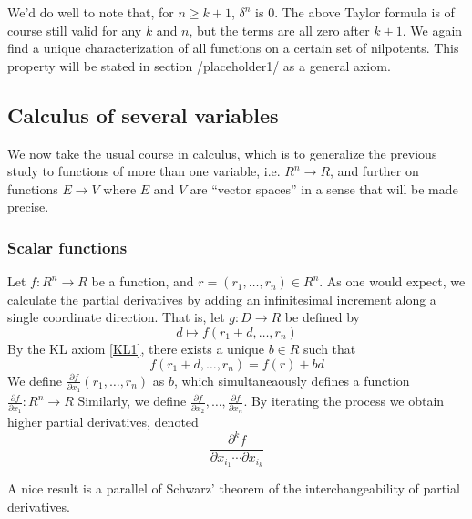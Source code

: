 \documentclass[11pt]{article}
\theoremstyle{definition}
\newcommand{\ddx}[2]{\frac{\partial #1}{\partial #2}} %
\newcommand{\ddxk}[4]{\frac{\partial^{#1} #2}{\partial #3 \cdots \partial #4}} %
\numberwithin{equation}{section}
\begin{document}
We'd do well to note that, for \( n\geq k+1 \), \( \delta^n \) is 0. The above Taylor formula is of course still valid for any \( k \) and \( n \), but the terms are all zero after \( k+1 \). We again find a unique characterization of all functions on a certain set of nilpotents. This property will be stated in section {/placeholder1/} as a general axiom.

\subsection{Calculus of several variables}
We now take the usual course in calculus, which is to generalize the previous study to functions of more than one variable, i.e. \( R^n\to R \), and further on functions \( E\to V \) where \( E \) and \( V \) are ``vector spaces'' in a sense that will be made precise.

\subsubsection{Scalar functions}
Let \( f:R^n\to R \) be a function, and \( r=(r_1,\dots,r_n)\in R^n \). As one would expect, we calculate the partial derivatives by adding an infinitesimal increment along a single coordinate direction. That is, let \( g: D\to R \) be defined by
\begin{equation*}
  d\mapsto f(r_1+d,\dots,r_n)
\end{equation*}
By the KL axiom \ref{KL1}, there exists a unique \( b\in R \) such that
\begin{equation*}
  f(r_1+d,\dots,r_n) = f(r) + bd
\end{equation*}
We define \( \ddx{f}{x_1}(r_1,\dots,r_n)\) as \( b \), which simultaneaously defines a function \( \ddx{f}{x_1}:R^n\to R \) Similarly, we define \( \ddx{f}{x_2},\dots,\ddx{f}{x_n} \). By iterating the process we obtain higher partial derivatives, denoted
\begin{equation*}
  \ddxk{k}{f}{x_{i_1}}{x_{i_k}}
\end{equation*}

A nice result is a parallel of Schwarz' theorem of the interchangeability of partial derivatives.
\end{document}
